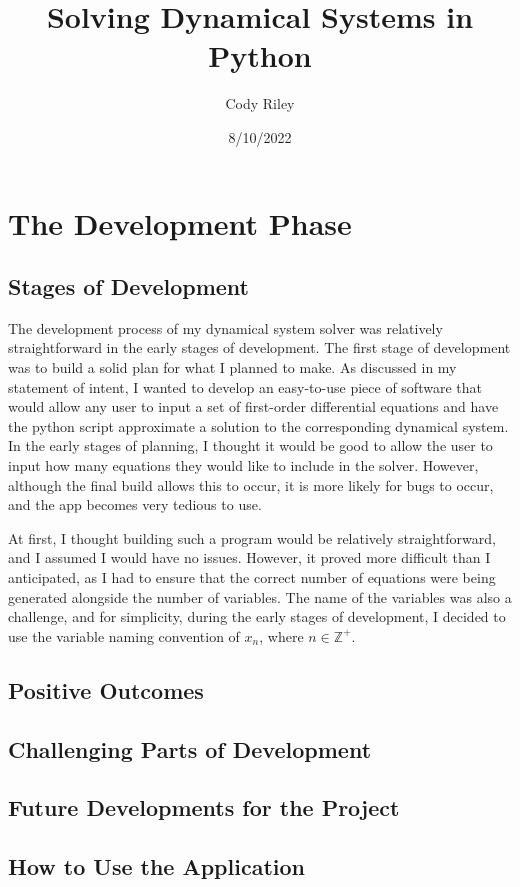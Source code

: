 \documentclass[12pt]{report}
\title{Solving Dynamical Systems in Python}
\author{Cody Riley}
\date{8/10/2022}
\begin{document}
\maketitle
\newpage
\chapter{The Development Phase}
\section{Stages of Development}
The development process of my dynamical system solver was relatively straightforward in the early stages of development. The first stage of development was to build a solid plan for what I planned to make. As discussed in my statement of intent, I wanted to develop an easy-to-use piece of software that would allow any user to input a set of first-order differential equations and have the python script approximate a solution to the corresponding dynamical system. In the early stages of planning, I thought it would be good to allow the user to input how many equations they would like to include in the solver. However, although the final build allows this to occur, it is more likely for bugs to occur, and the app becomes very tedious to use.
\smallskip

At first, I thought building such a program would be relatively straightforward, and I assumed I would have no issues. However, it proved more difficult than I anticipated, as I had to ensure that the correct number of equations were being generated alongside the number of variables. The name of the variables was also a challenge, and for simplicity, during the early stages of development, I decided to use the variable naming convention of $x_{n}$, where $n \in \mathbb{Z}^{+}$.
\section{Positive Outcomes}
\section{Challenging Parts of Development}
\section{Future Developments for the Project}

\section{How to Use the Application}
\end{document}
